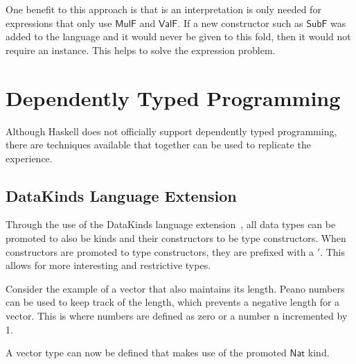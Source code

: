 \documentclass[dissertation.tex]{subfiles}
\newcommand{\Conid}[1]{\mathit{#1}}
\newcommand{\Varid}[1]{\mathit{#1}}
\def\resethooks{%
  \global\let\SaveRestoreHook\empty
  \global\let\ColumnHook\empty}
\newcommand{\hsindent}[1]{\quad}%
\let\hspre\empty
\let\hspost\empty
\providecommand\codeskip{\mskip\codemuskip}%
\let\codefont\textsf
\renewcommand\Varid[1]{\codefont{#1}}
\let\Conid\Varid
\begin{document}
One benefit to this approach is that is an interpretation is only needed for expressions that only use \ensuremath{\Conid{MulF}} and \ensuremath{\Conid{ValF}}.
If a new constructor such as \ensuremath{\Conid{SubF}} was added to the language and it would never be given to this fold, then it would not require an instance.
This helps to solve the expression problem.











\section{Dependently Typed Programming}
Although Haskell does not officially support dependently typed programming, there are techniques available that together can be used to replicate the experience.

\subsection{DataKinds Language Extension}


Through the use of the DataKinds language extension~\cite{10.1145/2103786.2103795}, all data types can be promoted to also be kinds and their constructors to be type constructors.
When constructors are promoted to type constructors, they are prefixed with a \ensuremath{'}.
This allows for more interesting and restrictive types.

Consider the example of a vector that also maintains its length.
Peano numbers can be used to keep track of the length, which prevents a negative length for a vector.
This is where numbers are defined as zero or a number n incremented by 1.

\resethooks

\noindent
A vector type can now be defined that makes use of the promoted \ensuremath{\Conid{Nat}} kind.
\end{document}

